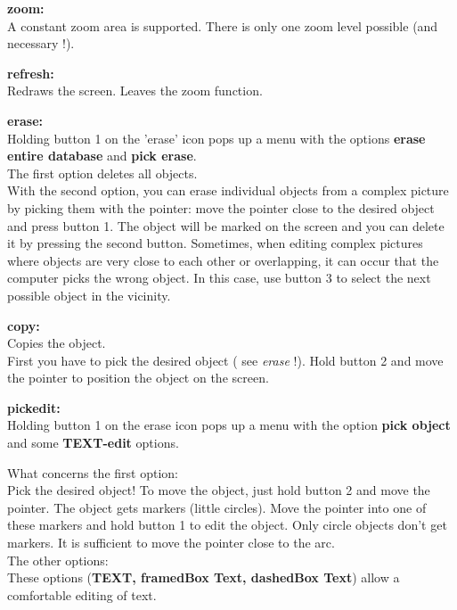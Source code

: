 \begin{description}
  \item{\bf zoom:} \\
     A constant zoom area is supported.
     There is only one zoom level possible (and necessary !).
  \item{\bf refresh:} \\
     Redraws the screen.
     Leaves the zoom function.
  \item{\bf erase:} \\
     Holding button 1 on the 'erase' icon pops up a menu
     with the options {\bf erase entire database} and {\bf pick erase}.\\
     The first option deletes all objects.\\
     With the second option, you can erase individual
     objects from a complex picture by picking them with
     the pointer: move the pointer close to the desired object
     and press button 1. The object will be marked on the
     screen and you can delete it by pressing the second button.
     Sometimes, when editing complex pictures where objects
     are very close to each other or overlapping, it can occur
     that the computer picks the wrong object. In this case,
     use button 3 to select the next possible object in the
     vicinity.
  \item{\bf copy:} \\
     Copies the object.\\
     First you have to pick the desired object ( see {\it erase} !).
     Hold button 2 and move the pointer to position the object
     on the screen.
     
    
  \item{\bf pickedit:} \\
     Holding button 1 on the erase icon pops up a menu
     with the option {\bf pick object} and some {\bf TEXT-edit} options.

     What concerns the first option:\\
          Pick the desired object!
          To move the object, just hold button 2 and move the
          pointer.
          The object gets markers (little circles). Move the
          pointer into one of these markers and hold button 1 to
          edit the object. Only circle objects don't get
          markers. It is sufficient to move the pointer close to
          the arc.\\

     The other options:\\
          These options ({\bf TEXT, framedBox Text, dashedBox Text})
          allow a comfortable editing of text.


\end{description}
